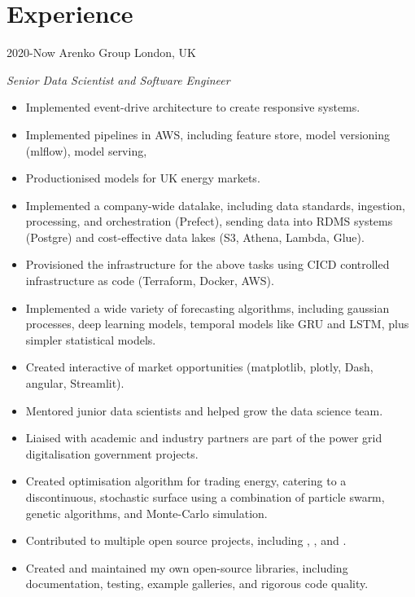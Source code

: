 \section{Experience}

\begin{entrylist}
\entry
{2020-Now}
{Arenko Group}
{London, UK}
{\emph{Senior Data Scientist and Software Engineer}
\begin{itemize}
	\item Implemented event-drive architecture to create responsive systems.
	\item Implemented  pipelines in AWS, including feature store, model versioning (mlflow), model serving,
	\item Productionised  models for UK energy markets.
	\item Implemented a company-wide datalake, including data standards, ingestion, processing, and orchestration (Prefect), sending data into
	RDMS systems (Postgre) and cost-effective data lakes (S3, Athena, Lambda, Glue).
	\item Provisioned the infrastructure for the above tasks using CICD controlled infrastructure as code (Terraform, Docker, AWS).
    \item Implemented a wide variety of forecasting algorithms, including gaussian processes, deep learning models,
temporal models like GRU and LSTM, plus simpler statistical models.
	\item Created interactive  of market opportunities (matplotlib, plotly, Dash, angular, Streamlit).
	\item Mentored junior data scientists and helped grow the data science team.
	\item Liaised with academic and industry partners are part of the power grid digitalisation government projects.
	\item Created optimisation algorithm for trading energy, catering to a discontinuous, stochastic surface using a combination
	of particle swarm, genetic algorithms, and Monte-Carlo simulation.
	\item Contributed to multiple open source projects, including , ,  and .
	\item Created and maintained my own open-source libraries, including documentation, testing, example galleries, and rigorous code quality.
\end{itemize}
}
\end{entrylist}

